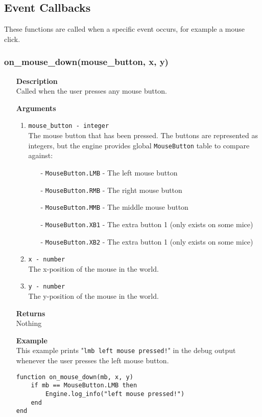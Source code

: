 \documentclass[12pt,a4paper]{article}
\begin{document}
\subsection{Event Callbacks}

These functions are called when a specific event occurs, for example a mouse click.

\subsubsection{on\_mouse\_down(mouse\_button, x, y)}
\begin{itemize}
	\item[]{\bf Description}
		\\ Called when the user presses any mouse button.
	\item[]{\bf Arguments}
		\begin{enumerate}
			\item{\texttt{mouse\_button - integer}} 
				\\ The mouse button that has been pressed. The buttons are represented as integers, but the engine provides global \texttt{MouseButton} table to compare against:
				\begin{itemize}
					\item[-]\texttt{MouseButton.LMB} - The left mouse button
					\item[-]\texttt{MouseButton.RMB} - The right mouse button
					\item[-]\texttt{MouseButton.MMB} - The middle mouse button
					\item[-]\texttt{MouseButton.XB1} - The extra button 1 (only exists on some mice)
					\item[-]\texttt{MouseButton.XB2} - The extra button 1 (only exists on some mice)
				\end{itemize}
			\item{\texttt{x - number}}
				\\ The x-position of the mouse in the world.
			\item{\texttt{y - number}}
				\\ The y-position of the mouse in the world.
		\end{enumerate}
	\item[]{\bf Returns}
		\\ Nothing
	\item[]{\bf Example}
	\\ This example prints "\texttt{lmb left mouse pressed!}" in the debug output whenever the user presses the left mouse button.
\begin{lstlisting}[language={[5.0]Lua}]
function on_mouse_down(mb, x, y)
    if mb == MouseButton.LMB then
        Engine.log_info("left mouse pressed!")
    end
end
\end{lstlisting}
\end{itemize}
\end{document}
